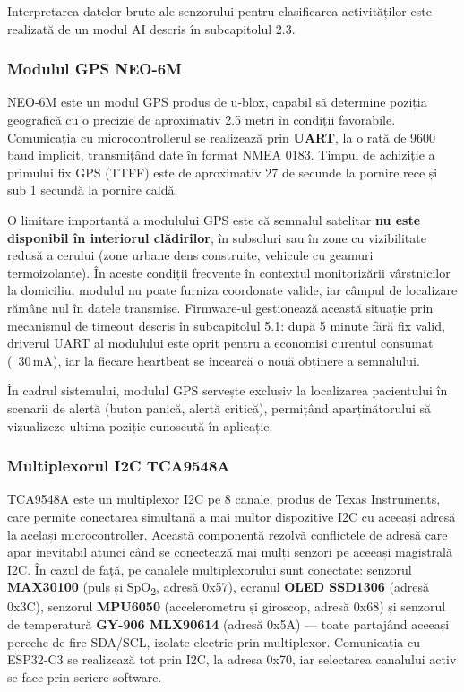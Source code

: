 \documentclass[12pt,a4paper,twoside]{article}
\newcommand{\spo}{SpO\textsubscript{2}}
\begin{document}
Interpretarea datelor brute ale senzorului pentru clasificarea activităților este realizată de un modul AI descris în subcapitolul 2.3.

\subsubsection{Modulul GPS NEO-6M}

NEO-6M este un modul GPS produs de u-blox, capabil să determine poziția geografică cu o precizie de aproximativ 2.5 metri în condiții favorabile. Comunicația cu microcontrollerul se realizează prin \textbf{UART}, la o rată de 9600 baud implicit, transmițând date în format NMEA 0183. Timpul de achiziție a primului fix GPS (TTFF) este de aproximativ 27 de secunde la pornire rece și sub 1 secundă la pornire caldă.

O limitare importantă a modulului GPS este că semnalul satelitar \textbf{nu este disponibil în interiorul clădirilor}, în subsoluri sau în zone cu vizibilitate redusă a cerului (zone urbane dens construite, vehicule cu geamuri termoizolante). În aceste condiții frecvente în contextul monitorizării vârstnicilor la domiciliu, modulul nu poate furniza coordonate valide, iar câmpul de localizare rămâne nul în datele transmise. Firmware-ul gestionează această situație prin mecanismul de timeout descris în subcapitolul 5.1: după 5 minute fără fix valid, driverul UART al modulului este oprit pentru a economisi curentul consumat (~30\,mA), iar la fiecare heartbeat se încearcă o nouă obținere a semnalului.

În cadrul sistemului, modulul GPS servește exclusiv la localizarea pacientului în scenarii de alertă (buton panică, alertă critică), permițând aparținătorului să vizualizeze ultima poziție cunoscută în aplicație.

\subsubsection{Multiplexorul I2C TCA9548A}

TCA9548A este un multiplexor I2C pe 8 canale, produs de Texas Instruments, care permite conectarea simultană a mai multor dispozitive I2C cu aceeași adresă la același microcontroller. Această componentă rezolvă conflictele de adresă care apar inevitabil atunci când se conectează mai mulți senzori pe aceeași magistrală I2C. În cazul de față, pe canalele multiplexorului sunt conectate: senzorul \textbf{MAX30100} (puls și \spo, adresă 0x57), ecranul \textbf{OLED SSD1306} (adresă 0x3C), senzorul \textbf{MPU6050} (accelerometru și giroscop, adresă 0x68) și senzorul de temperatură \textbf{GY-906 MLX90614} (adresă 0x5A) — toate partajând aceeași pereche de fire SDA/SCL, izolate electric prin multiplexor. Comunicația cu ESP32-C3 se realizează tot prin I2C, la adresa 0x70, iar selectarea canalului activ se face prin scriere software.
\end{document}
